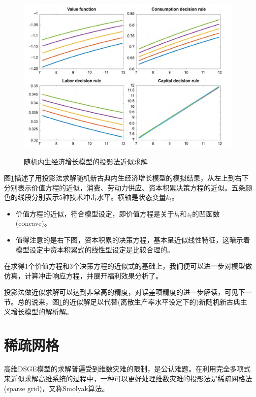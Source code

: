 \begin{figure}[htbp]
   \caption[随机NCGT模型的投影法近似求解]{随机内生经济增长模型的投影法近似求解}
  \centering
  \includegraphics[width=12cm]{./Figures/20180325-projection-residual-analysis}
  \label{fig:pj-simulations-residual}
%
\end{figure}

图\ref{fig:pj-simulations-residual}描述了用投影法求解随机新古典内生经济增长模型的模拟结果，从左上到右下分别表示价值方程的近似，消费、劳动力供应、资本积累决策方程的近似。五条颜色的线段分别表示5种技术冲击水平。横轴是状态变量$k_{t}$。
\begin{itemize}
  \item 价值方程的近似，符合模型设定，即价值方程是关于$k_{t}$和$z_{t}$的凹函数(concave)。
  \item 值得注意的是右下图，资本积累的决策方程，基本呈近似线性特征，这暗示着模型设定中资本积累式的线性型设定是比较合理的。
\end{itemize}

在求得1个价值方程和3个决策方程的近似式的基础上，我们便可以进一步对模型做仿真，计算冲击响应方程，并展开福利效果分析了。

投影法做近似求解可以达到非常高的精度，对误差项精度的进一步解读，可见下一节。总的说来，图\ref{fig:pj-simulations-residual}的近似解足以代替(离散生产率水平设定下的)新随机新古典主义增长模型的解析解。


\section{稀疏网格}
\label{sec:pj-sparsity}
高维DSGE模型的求解普遍受到维数灾难的限制，是公认难题。在利用完全多项式来近似求解高维系统的过程中，一种可以更好处理维数灾难的投影法是稀疏网格法(sparse grid)，又称Smolyak算法。

